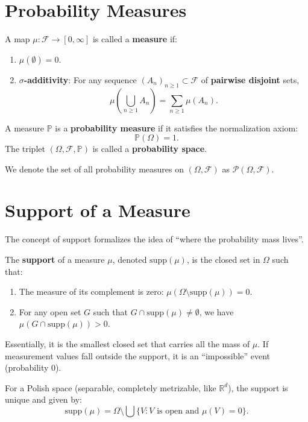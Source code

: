 \section{Probability Measures}

\begin{definition}[Measure]
A map $\mu: \mathcal{F} \to [0, \infty]$ is called a \textbf{measure} if:
\begin{enumerate}
    \item $\mu(\emptyset) = 0$.
    \item \textbf{$\sigma$-additivity}: For any sequence $(A_n)_{n \geq 1} \subset \mathcal{F}$ of \textbf{pairwise disjoint} sets,
    \[
    \mu\left( \bigcup_{n \geq 1} A_n \right) = \sum_{n \geq 1} \mu(A_n).
    \]
\end{enumerate}
\end{definition}

\begin{definition}
A measure $\mathbb{P}$ is a \textbf{probability measure} if it satisfies the normalization axiom:
\[
\mathbb{P}(\Omega) = 1.
\]
The triplet $(\Omega, \mathcal{F}, \mathbb{P})$ is called a \textbf{probability space}.
\end{definition}

We denote the set of all probability measures on $(\Omega, \mathcal{F})$ as $\mathcal{P}(\Omega, \mathcal{F})$.

\section{Support of a Measure}

The concept of support formalizes the idea of ``where the probability mass lives''.

\begin{definition}[Support]
The \textbf{support} of a measure $\mu$, denoted $\text{supp}(\mu)$, is the closed set in $\Omega$ such that:
\begin{enumerate}
    \item The measure of its complement is zero: $\mu(\Omega \setminus \text{supp}(\mu)) = 0$.
    \item For any open set $G$ such that $G \cap \text{supp}(\mu) \neq \emptyset$, we have $\mu(G \cap \text{supp}(\mu)) > 0$.
\end{enumerate}
Essentially, it is the smallest closed set that carries all the mass of $\mu$. If measurement values fall outside the support, it is an ``impossible'' event (probability 0).
\end{definition}
For a Polish space (separable, completely metrizable, like $\mathbb{R}^d$), the support is unique and given by:
\[
\text{supp}(\mu) = \Omega \setminus \bigcup \{ V : V \text{ is open and } \mu(V) = 0 \}.
\]
